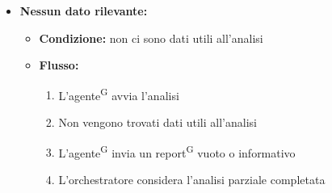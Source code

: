 \documentclass[a4paper, 11pt]{article}
\begin{document}
\begin{itemize}
\begin{itemize}
\begin{itemize}
\begin{enumerate}
					\item L'agente\textsuperscript{G} avvia l'analisi
					\item Si verifica un errore
					\item L'agente\textsuperscript{G} genera un report\textsuperscript{G} di errore
					\item Il report\textsuperscript{G} viene inviato all'orchestratore
				\end{enumerate}
			\end{itemize}
		\item \textbf{Nessun dato rilevante:}
			\begin{itemize}
				\item \textbf{Condizione:} non ci sono dati utili all'analisi
				\item \textbf{Flusso:}
				\begin{enumerate}
					\item L'agente\textsuperscript{G} avvia l'analisi
					\item Non vengono trovati dati utili all'analisi
					\item L'agente\textsuperscript{G} invia un report\textsuperscript{G} vuoto o informativo
					\item L'orchestratore considera l'analisi parziale completata
				\end{enumerate}
			\end{itemize}
	\end{itemize}
\end{itemize}
\end{document}
